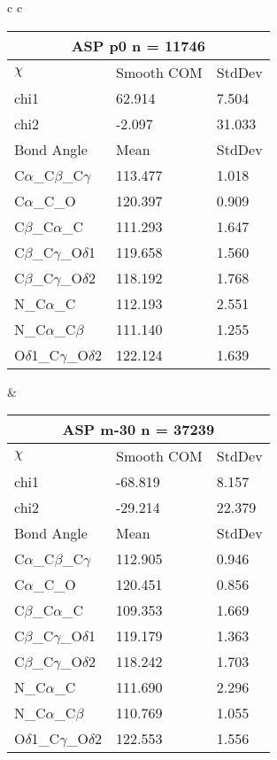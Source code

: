\begin{longtable}{ c c }

  \begin{tabular}{ l l l }
  \toprule
  \multicolumn{3}{c}{ASP \textbf{p0} n = 11746} \\ \toprule
  $\chi$       & Smooth COM & StdDev \\ \midrule
  chi1 & 62.914 & 7.504 \\ 
  chi2 & -2.097 & 31.033 \\ \midrule
  Bond Angle   & Mean     & StdDev \\ \midrule
  C$\alpha$\_C$\beta$\_C$\gamma$ & 113.477 & 1.018\\
  C$\alpha$\_C\_O & 120.397 & 0.909\\
  C$\beta$\_C$\alpha$\_C & 111.293 & 1.647\\
  C$\beta$\_C$\gamma$\_O$\delta$1 & 119.658 & 1.560\\
  C$\beta$\_C$\gamma$\_O$\delta$2 & 118.192 & 1.768\\
  N\_C$\alpha$\_C & 112.193 & 2.551\\
  N\_C$\alpha$\_C$\beta$ & 111.140 & 1.255\\
  O$\delta$1\_C$\gamma$\_O$\delta$2 & 122.124 & 1.639\\
  \bottomrule
  \end{tabular}
  &
  \begin{tabular}{ l l l }
  \toprule
  \multicolumn{3}{c}{ASP \textbf{m-30} n = 37239} \\ \toprule
  $\chi$       & Smooth COM & StdDev \\ \midrule
  chi1 & -68.819 & 8.157 \\ 
  chi2 & -29.214 & 22.379 \\ \midrule
  Bond Angle   & Mean     & StdDev \\ \midrule
  C$\alpha$\_C$\beta$\_C$\gamma$ & 112.905 & 0.946\\
  C$\alpha$\_C\_O & 120.451 & 0.856\\
  C$\beta$\_C$\alpha$\_C & 109.353 & 1.669\\
  C$\beta$\_C$\gamma$\_O$\delta$1 & 119.179 & 1.363\\
  C$\beta$\_C$\gamma$\_O$\delta$2 & 118.242 & 1.703\\
  N\_C$\alpha$\_C & 111.690 & 2.296\\
  N\_C$\alpha$\_C$\beta$ & 110.769 & 1.055\\
  O$\delta$1\_C$\gamma$\_O$\delta$2 & 122.553 & 1.556\\
  \bottomrule

\end{tabular}
\end{longtable}
